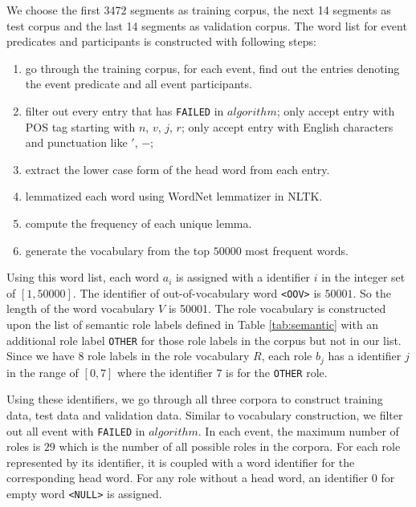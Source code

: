 \documentclass[a4paper]{article}
\begin{document}
We choose the first 3472 segments as training corpus, the next 14 segments as test corpus and the last 14 segments as validation corpus. The word list for event predicates and participants is constructed with following steps: 
\begin{enumerate}
  \item  go through the training corpus, for each event, find out the entries denoting the event predicate and all event participants. 
  \item  filter out every entry that has \texttt{FAILED} in $algorithm$; only accept entry with POS tag starting with $n$, $v$, $j$, $r$; only accept entry with English characters and punctuation like $'$, $-$; 
  \item  extract the lower case form of the head word from each entry.
  \item  lemmatized each word using WordNet lemmatizer in NLTK. 
  \item  compute the frequency of each unique lemma. 
  \item  generate the vocabulary from the top $50000$ most frequent words. 
\end{enumerate}
Using this word list, each word $a_i$ is assigned with a identifier $i$ in the integer set of $[1, 50000]$. The identifier of out-of-vocabulary word \texttt{<OOV>} is $50001$. So the length of the word vocabulary $V$ is 50001. The role vocabulary is constructed upon the list of semantic role labels defined in Table \ref{tab:semantic} with an additional role label \texttt{OTHER} for those role labels in the corpus but not in our list. Since we have $8$ role labels in the role vocabulary $R$, each role $b_j$ has a identifier $j$ in the range of $[0, 7]$ where the identifier $7$ is for the \texttt{OTHER} role. 

Using these identifiers, we go through all three corpora to construct training data, test data and validation data. Similar to vocabulary construction, we filter out all event with \texttt{FAILED} in $algorithm$. In each event, the maximum number of roles is $29$ which is the number of all possible roles in the corpora. For each role represented by its identifier, it is coupled with a word identifier for the corresponding head word. For any role without a head word, an identifier $0$ for empty word \texttt{<NULL>} is assigned. 
\end{document}
